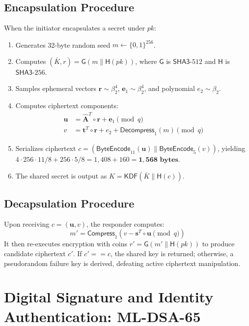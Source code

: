 \subsection{Encapsulation Procedure}
When the initiator encapsulates a secret under $pk$:
\begin{enumerate}
    \item Generates 32-byte random seed $m \leftarrow \{0, 1\}^{256}$.
    \item Computes $(\bar{K}, r) = \mathsf{G}(m \parallel \mathsf{H}(pk))$, where $\mathsf{G}$ is $\mathsf{SHA3}\text{-}512$ and $\mathsf{H}$ is $\mathsf{SHA3}\text{-}256$.
    \item Samples ephemeral vectors $\mathbf{r} \sim \beta_2^4$, $\mathbf{e}_1 \sim \beta_2^4$, and polynomial $e_2 \sim \beta_2$.
    \item Computes ciphertext components:
    \begin{align}
    \mathbf{u} &= \hat{\mathbf{A}}^T \circ \mathbf{r} + \mathbf{e}_1 \pmod q \\
    v &= \mathbf{t}^T \circ \mathbf{r} + e_2 + \mathsf{Decompress}_1(m) \pmod q
    \end{align}
    \item Serializes ciphertext $c = (\mathsf{ByteEncode}_{11}(\mathbf{u}) \parallel \mathsf{ByteEncode}_5(v))$, yielding $4 \cdot 256 \cdot 11 / 8 + 256 \cdot 5 / 8 = 1,408 + 160 = \mathbf{1,568\text{ bytes}}$.
    \item The shared secret is output as $K = \mathsf{KDF}(\bar{K} \parallel \mathsf{H}(c))$.
\end{enumerate}

\subsection{Decapsulation Procedure}
Upon receiving $c = (\mathbf{u}, v)$, the responder computes:
\begin{equation}
m' = \mathsf{Compress}_1(v - \mathbf{s}^T \circ \mathbf{u} \pmod q)
\end{equation}
It then re-executes encryption with coins $r' = \mathsf{G}(m' \parallel \mathsf{H}(pk))$ to produce candidate ciphertext $c'$. If $c' == c$, the shared key is returned; otherwise, a pseudorandom failure key is derived, defeating active ciphertext manipulation.

\section{Digital Signature and Identity Authentication: ML-DSA-65}
\label{sec:mldsa_mechanics}

